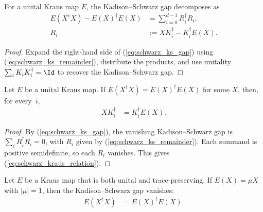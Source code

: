 \begin{theorem}\label{thm:ks_gap_decomp}
    \leanok
    For a unital Kraus map $E$, the Kadison--Schwarz gap decomposes as
    \begin{align}
        E(X^\dagger X)-E(X)^\dagger E(X)
        &= \sum_{i=0}^{d-1} R_i^\dagger R_i,
        \label{eq:schwarz_ks_gap}\\
        R_i
        &:= X K_i^\dagger-K_i^\dagger E(X).
        \label{eq:schwarz_ks_remainder}
    \end{align}
\end{theorem}

\begin{proof}
    \leanok
    Expand the right-hand side of (\ref{eq:schwarz_ks_gap}) using
    (\ref{eq:schwarz_ks_remainder}), distribute the products, and use
    unitality $\sum_i K_i K_i^\dagger = \Id$ to recover the
    Kadison--Schwarz gap.
\end{proof}

\begin{theorem}\label{thm:kraus_commute}
    \leanok
    Let $E$ be a unital Kraus map.
    If $E(X^\dagger X) = E(X)^\dagger E(X)$ for some $X$, then, for every~$i$,
    \begin{align}
        X K_i^\dagger
        &= K_i^\dagger E(X).
        \label{eq:schwarz_kraus_relation}
    \end{align}
\end{theorem}

\begin{proof}\leanok{}
    By (\ref{eq:schwarz_ks_gap}), the vanishing Kadison--Schwarz gap is
    $\sum_i R_i^\dagger R_i=0$, with $R_i$ given by
    (\ref{eq:schwarz_ks_remainder}). Each summand is positive semidefinite, so
    each $R_i$ vanishes. This gives (\ref{eq:schwarz_kraus_relation}).
\end{proof}

\begin{theorem}\label{thm:ks_peripheral}
    \leanok
    Let $E$ be a Kraus map that is both unital and trace-preserving.
    If $E(X) = \mu X$ with $|\mu| = 1$, then the Kadison--Schwarz gap
    vanishes:
    \begin{align}
        E(X^\dagger X)
        &= E(X)^\dagger E(X).
        \label{eq:schwarz_peripheral_equality}
    \end{align}
\end{theorem}

